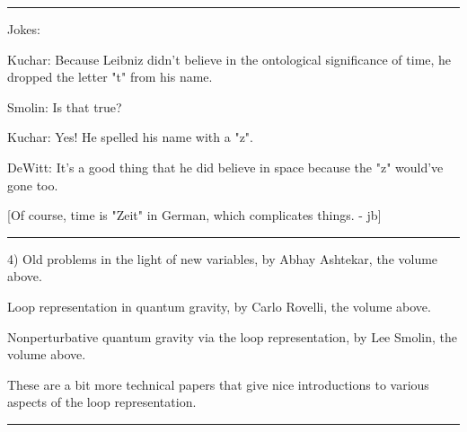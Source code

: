 \par\noindent\rule{\textwidth}{0.4pt}

Jokes:

Kuchar: Because Leibniz didn't believe in the ontological
significance of time, he dropped the letter "t" from his name.

Smolin: Is that true?

Kuchar: Yes!  He spelled his name with a "z".

DeWitt: It's a good thing that he did believe in space because
the "z" would've gone too.

[Of course, time is "Zeit" in German, which complicates things. - jb]


\par\noindent\rule{\textwidth}{0.4pt}

4) Old problems in the light of new variables, by Abhay Ashtekar,
the volume above.

Loop representation in quantum gravity, by Carlo Rovelli, the
volume above.

Nonperturbative quantum gravity via the loop representation, by
Lee Smolin, the volume above.


These are a bit more technical papers that give nice
introductions to various aspects of the loop representation.
\par\noindent\rule{\textwidth}{0.4pt}

